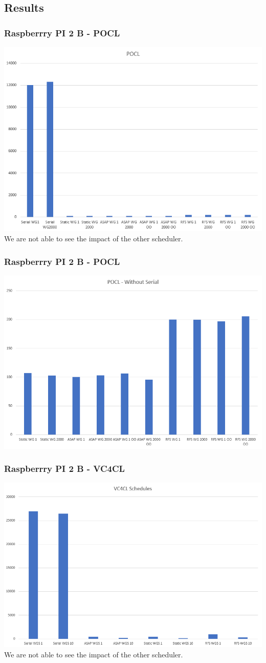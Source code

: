 \documentclass{beamer}
\begin{document}
\subsection{Results}
\begin{frame}
   \frametitle{Raspberrry PI 2 B - POCL}
   \includegraphics[width=.8\textwidth]{res/ResultsPOCL.PNG}\\
   We are not able to see the impact of the other scheduler.
\end{frame}
\begin{frame}
	\frametitle{Raspberrry PI 2 B - POCL}
	\includegraphics[width=.8\textwidth]{res/ResultsPOCL_WithoutSerial.PNG}
\end{frame}
\begin{frame}
	\frametitle{Raspberrry PI 2 B - VC4CL}
	\includegraphics[width=.8\textwidth]{res/ResultsVC4CL.PNG}\\
	We are not able to see the impact of the other scheduler.
\end{frame}
\end{document}
